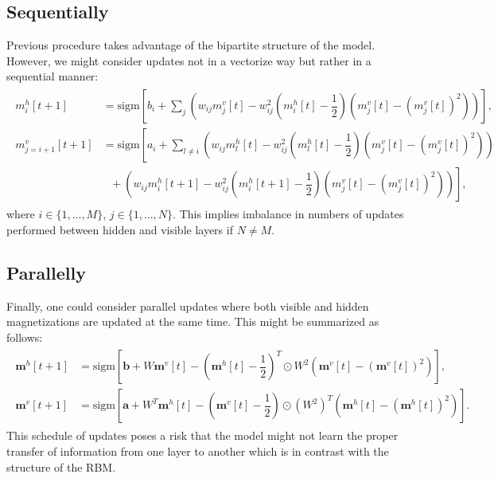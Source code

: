 \subsection{Sequentially}
Previous procedure takes advantage of the bipartite structure of the model. However, we might consider updates not in a vectorize way but rather in a sequential manner: 
\begin{align}
\begin{split}
m_i^{h}[t+1] & = \text{sigm} \left[b_i + \sum_j \left( w_{ij}m_j^{v}[t] - w_{ij}^2  (m_i^h[t] - \dfrac{1}{2}) \left(m_j^v[t] - (m_j^v[t])^2 \right)  \right)\right],  \\
m_{j = i+1}^v[t+1] & = \text{sigm} \left[ a_i + \sum_{l \neq i} \left( w_{ij}m_l^{h}[t] - w_{ij}^2  (m_l^h[t] - \dfrac{1}{2}) (m_j^v[t] - (m_j^v[t])^2)  \right)  \right.\\
& ~~~ + \left. \left( w_{ij}m_i^{h}[t +1] - w_{ij}^2  (m_i^h[t+1] - \dfrac{1}{2}) (m_j^v[t] - (m_j^v[t])^2)  \right) \right],
\end{split}
\label{eq:sequential}
\end{align}
where $i \in \{1, ..., M\}$, $j \in \{1,..., N \}$. This implies imbalance in numbers of updates performed between hidden and visible layers if $N \neq M$.

\subsection{Parallelly}
Finally, one could consider parallel updates where both visible and hidden magnetizations are updated at the same time. This might be summarized as follows:
\begin{align}
\begin{split}
\mathbf{m}^h[t+1] & = \text{sigm} \left[  \mathbf{b} + W \mathbf{m}^v[t] - \left( \mathbf{m}^h[t] - \dfrac{1}{2}\right)^T \odot W^2 \left( \mathbf{m}^v[t] - ( \mathbf{m}^v[t])^2 \right) \right], \\
\mathbf{m}^v[t+1] & = \text{sigm} \left[  \mathbf{a} + W^T \mathbf{m}^h[t] -\left( \mathbf{m}^v[t] - \dfrac{1}{2}\right) \odot (W^2)^T  \left(\mathbf{m}^h[t] - (\mathbf{m}^h[t])^2 \right) \right].
\end{split}
\end{align}
This schedule of updates poses a risk that the model might not learn the proper transfer of information from one layer to another which is in contrast with the structure of the RBM.

